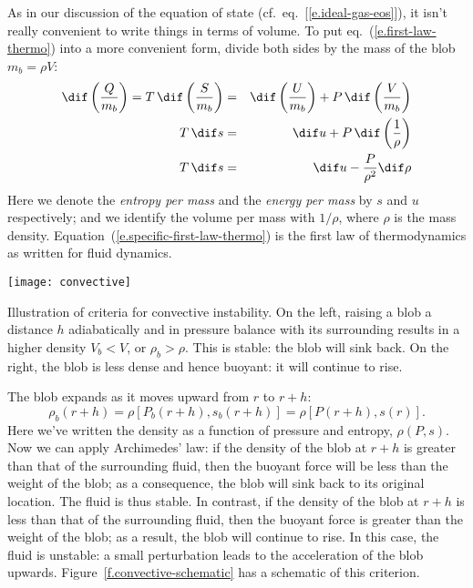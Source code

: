 As in our discussion of the equation of state (cf.\ eq.~[\ref{e.ideal-gas-eos}]), it isn't really convenient to write things in terms of volume. To put eq.~(\ref{e.first-law-thermo}) into a more convenient form, divide both sides by the mass of the blob $m_{b}=\rho V$:
\begin{eqnarray}
	\dif\left(\frac{Q}{m_{b}}\right) = T\,\dif\left(\frac{S}{m_{b}}\right) &=&
		\dif\left(\frac{U}{m_{b}}\right) + P\,\dif\left(\frac{V}{m_{b}}\right)\nonumber\\
	T\,\dif s &=& \dif u + P\,\dif\left(\frac{1}{\rho}\right)\nonumber\\
	T\,\dif s &=& \dif u - \frac{P}{\rho^{2}}\dif\rho \label{e.specific-first-law-thermo}
\end{eqnarray}
Here we denote the \emph{entropy per mass} and the \emph{energy per mass} by $s$ and $u$ respectively; and we identify the volume per mass with $1/\rho$, where $\rho$ is the mass density. Equation~(\ref{e.specific-first-law-thermo}) is the first law of thermodynamics as written for fluid dynamics.

\begin{marginfigure}
\texttt{[image: convective]}
\caption[Illustration of criteria for convective instability]{\label{f.convective-schematic}Illustration of criteria for convective instability.  On the left, raising a blob a distance $h$ adiabatically and in pressure balance with its surrounding results in a higher density $V_{b} < V$, or $\rho_{b} > \rho$.  This is stable: the blob will sink back.  On the right, the blob is less dense and hence buoyant: it will continue to rise.}
\end{marginfigure}
The blob expands as it moves upward from $r$ to $r+h$:
\[
	\rho_{b}(r+h) = \rho[P_{b}(r+h),s_{b}(r+h)] = \rho[P(r+h),s(r)].
\]
Here we've written the density as a function of pressure and entropy, $\rho(P,s)$. Now we can apply Archimedes' law: if the density of the blob at $r+h$ is greater than that of the surrounding fluid, then the buoyant force will be less than the weight of the blob; as a consequence, the blob will sink back to its original location. The fluid is thus stable. In contrast, if the density of the blob at $r+h$ is less than that of the surrounding fluid, then the buoyant force is greater than the weight of the blob; as a result, the blob will continue to rise. In this case, the fluid is unstable: a small perturbation leads to the acceleration of the blob upwards. Figure~\ref{f.convective-schematic} has a schematic of this criterion.

